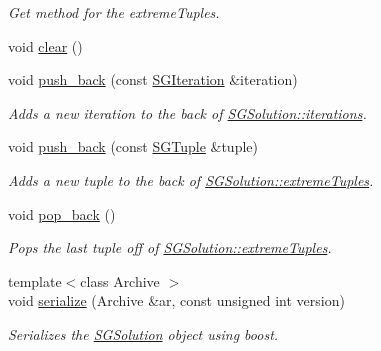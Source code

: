 \begin{DoxyCompactItemize}
\begin{DoxyCompactList}\small\item\em Get method for the extreme\+Tuples. \end{DoxyCompactList}\item 
void \hyperlink{classSGSolution_a68da05d07ecac89a12e8534e3cfb1cf1}{clear} ()
\item 
\mbox{\label{classSGSolution_a6cda35ac7063b84ff58d8aad1117cf4d}} 
void \hyperlink{classSGSolution_a6cda35ac7063b84ff58d8aad1117cf4d}{push\+\_\+back} (const \hyperlink{classSGIteration}{S\+G\+Iteration} \&iteration)
\begin{DoxyCompactList}\small\item\em Adds a new iteration to the back of \hyperlink{classSGSolution_a7216ae67bed2fb1ede826053c1612fcb}{S\+G\+Solution\+::iterations}. \end{DoxyCompactList}\item 
\mbox{\label{classSGSolution_ad800f6067621bd28261602cda3ee09b8}} 
void \hyperlink{classSGSolution_ad800f6067621bd28261602cda3ee09b8}{push\+\_\+back} (const \hyperlink{classSGTuple}{S\+G\+Tuple} \&tuple)
\begin{DoxyCompactList}\small\item\em Adds a new tuple to the back of \hyperlink{classSGSolution_a8b3448a35113785102b6c5193ab87dc6}{S\+G\+Solution\+::extreme\+Tuples}. \end{DoxyCompactList}\item 
\mbox{\label{classSGSolution_aa3813b739fd539a4f6b20d0bb647b71d}} 
void \hyperlink{classSGSolution_aa3813b739fd539a4f6b20d0bb647b71d}{pop\+\_\+back} ()
\begin{DoxyCompactList}\small\item\em Pops the last tuple off of \hyperlink{classSGSolution_a8b3448a35113785102b6c5193ab87dc6}{S\+G\+Solution\+::extreme\+Tuples}. \end{DoxyCompactList}\item 
\mbox{\label{classSGSolution_a8c2f4af49071c5b3e55e232dfc9cebed}} 
{\footnotesize template$<$class Archive $>$ }\\void \hyperlink{classSGSolution_a8c2f4af49071c5b3e55e232dfc9cebed}{serialize} (Archive \&ar, const unsigned int version)
\begin{DoxyCompactList}\small\item\em Serializes the \hyperlink{classSGSolution}{S\+G\+Solution} object using boost. \end{DoxyCompactList}\end{DoxyCompactItemize}
